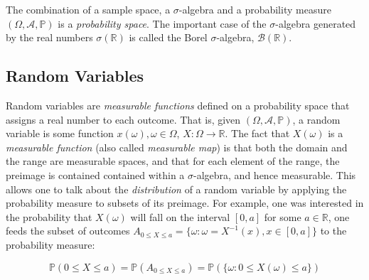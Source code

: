 The combination of a sample space, a $\sigma$-algebra and a probability measure $(\Omega,\mathscr{A},\mathbb{P})$ is a \textit{probability space}. The important case of the $\sigma$-algebra generated by the real numbers $\sigma(\mathbb{R})$ is called the Borel $\sigma$-algebra, $\mathscr{B}(\mathbb{R})$. 


\subsection{Random Variables}
Random variables are \textit{measurable functions} defined on a probability space that assigns a real number to each outcome. That is, given $(\Omega,\mathscr{A},\mathbb{P})$, a random variable is some function $x(\omega), \omega \in \Omega$, $X:\Omega \rightarrow \mathbb{R}$. The fact that $X(\omega)$ is a \textit{measurable function} (also called \textit{measurable map}) is that both the domain and the range are measurable spaces, and that for each element of the range, the preimage is contained contained within a $\sigma$-algebra, and hence measurable. This allows one to talk about the \textit{distribution} of a random variable by applying the probability measure to subsets of its preimage. For example, one was interested in the probability that $X(\omega)$ will fall on the interval $[0,a]$ for some $a\in \mathbb{R}$, one feeds the subset of outcomes $A_{0\leq X\leq a} = \{\omega : \omega=X^{-1}(x), x \in [0,a]\}$ to the probability measure:

\begin{equation}
\mathbb{P}(0\leq X \leq a) = \mathbb{P}(A_{0\leq X\leq a}) = \mathbb{P}(\{\omega : 0\leq X(\omega) \leq a\})
\end{equation} 








